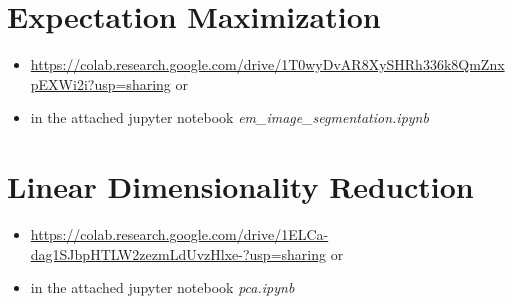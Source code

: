 \documentclass[
	ngerman,
	points=true,%
    solution=true,
    accentcolor=9c,
    colorbacktitle
	]{tudaexercise}
\begin{document}
\section*{Expectation Maximization}
\begin{itemize}
    \item \href{https://colab.research.google.com/drive/1T0wyDvAR8XySHRh336k8QmZnxpEXWi2i?usp=sharing}{https://colab.research.google.com/drive/1T0wyDvAR8XySHRh336k8QmZnxpEXWi2i?usp=sharing} or
    \item in the attached jupyter notebook \textit{em\_image\_segmentation.ipynb}
\end{itemize}

\section*{Linear Dimensionality Reduction}
\begin{itemize}
    \item \href{https://colab.research.google.com/drive/1ELCa-dag1SJbpHTLW2zezmLdUvzHlxe-?usp=sharing}{https://colab.research.google.com/drive/1ELCa-dag1SJbpHTLW2zezmLdUvzHlxe-?usp=sharing} or
    \item in the attached jupyter notebook \textit{pca.ipynb}
\end{itemize}





\end{document}
